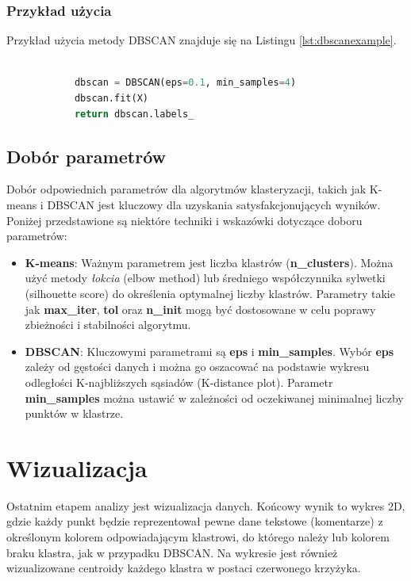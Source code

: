 			
		\subsubsection{Przykład użycia}
		
			Przykład użycia metody DBSCAN znajduje się na Listingu \ref{lst:dbscanexample}.
		
			\begin{lstlisting}[language=Python, caption={Przykład użycia algorytmu DBSCAN}, label={lst:dbscanexample}]
			
			dbscan = DBSCAN(eps=0.1, min_samples=4)
			dbscan.fit(X)
			return dbscan.labels_
			\end{lstlisting}
			
			
		
	\subsection{Dobór parametrów}
		Dobór odpowiednich parametrów dla algorytmów klasteryzacji, takich jak K-means i DBSCAN jest kluczowy dla uzyskania satysfakcjonujących wyników. Poniżej przedstawione są niektóre techniki i wskazówki dotyczące doboru parametrów:
		
		\begin{itemize}
			\item \textbf{K-means}: Ważnym parametrem jest liczba klastrów (\textbf{n\_clusters}). Można użyć metody \textit{łokcia} (elbow method) lub średniego współczynnika sylwetki (silhouette score) do określenia optymalnej liczby klastrów. Parametry takie jak \textbf{max\_iter}, \textbf{tol} oraz \textbf{n\_init} mogą być dostosowane w celu poprawy zbieżności i stabilności algorytmu.
			\item \textbf{DBSCAN}: Kluczowymi parametrami są \textbf{eps} i \textbf{min\_samples}. Wybór \textbf{eps} zależy od gęstości danych i można go oszacować na podstawie wykresu odległości K-najbliższych sąsiadów (K-distance plot). Parametr \textbf{min\_samples} można ustawić w zależności od oczekiwanej minimalnej liczby punktów w klastrze.
		\end{itemize}
		
			
\section{Wizualizacja}

	Ostatnim etapem analizy jest wizualizacja danych. Końcowy wynik to wykres 2D, gdzie każdy punkt będzie reprezentował pewne dane tekstowe (komentarze) z określonym kolorem odpowiadającym klastrowi, do którego należy lub kolorem braku klastra, jak w przypadku DBSCAN. Na wykresie jest również wizualizowane centroidy każdego klastra w postaci czerwonego krzyżyka.
	
